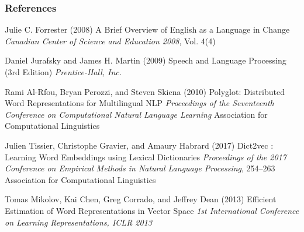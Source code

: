\begin{frame}
    \frametitle{References}
    \fontsize{8}{4}\selectfont
    \begin{thebibliography}{99} %
         Julie C. Forrester (2008)
        \newblock A Brief Overview of English as a Language in Change
        \newblock \emph{Canadian Center of Science and Education 2008}, Vol. 4(4) 
    
         Daniel Jurafsky and James H. Martin (2009)
        \newblock Speech and Language Processing (3rd Edition)
        \newblock \emph{Prentice-Hall, Inc.}
    
         Rami Al-Rfou, Bryan Perozzi,
        and Steven Skiena (2010)
        \newblock Polyglot: Distributed Word Representations for Multilingual {NLP}
        \newblock \emph{Proceedings of the Seventeenth Conference on Computational Natural Language Learning}
        \newblock Association for Computational Linguistics
    
         Julien Tissier, Christophe Gravier, and Amaury Habrard (2017)
        \newblock Dict2vec : Learning Word Embeddings using Lexical Dictionaries 
        \newblock \emph{Proceedings of the 2017 Conference on Empirical Methods in Natural Language Processing}, 254--263
        \newblock Association for Computational Linguistics
    
         Tomas Mikolov, Kai Chen, Greg Corrado, and Jeffrey Dean (2013)
        \newblock Efficient Estimation of Word Representations in Vector Space
        \newblock \emph{1st International Conference on Learning Representations, {ICLR} 2013}
     
    \end{thebibliography}
\end{frame}

    


